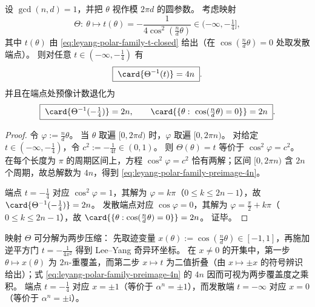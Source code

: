 \begin{proposition}[推前覆盖度与退化预像计数]\label{prop:leyang-polar-family-preimage-count}
设 \(\gcd(n,d)=1\)，并把 \(\theta\) 视作模 \(2\pi d\) 的圆参数。
考虑映射
\[
\Theta:\ \theta\longmapsto t(\theta)=-\frac{1}{4\cos^2(\frac{n}{d}\theta)}\in(-\infty,-\tfrac14],
\]
其中 \(t(\theta)\) 由 \eqref{eq:leyang-polar-family-t-closed} 给出（在 \(\cos(\frac{n}{d}\theta)=0\) 处取发散端点）。
则对任意 \(t\in(-\infty,-\tfrac14)\) 有
\begin{equation}\label{eq:leyang-polar-family-preimage-4n}
\boxed{\;\card{\Theta^{-1}(t)}=4n\; }.
\end{equation}
并且在端点处预像计数退化为
\begin{equation}\label{eq:leyang-polar-family-preimage-endpoints}
\boxed{\;
\card{\Theta^{-1}(-\tfrac14)}=2n,\qquad
\card{\{\theta:\ \cos(\tfrac{n}{d}\theta)=0\}}=2n\; }.
\end{equation}
\end{proposition}
\begin{proof}
令 \(\varphi:=\frac{n}{d}\theta\)。
当 \(\theta\) 取遍 \([0,2\pi d)\) 时，\(\varphi\) 取遍 \([0,2\pi n)\)。
对给定 \(t\in(-\infty,-\tfrac14)\)，令 \(c^2:=-\frac{1}{4t}\in(0,1)\)。
则 \(\Theta(\theta)=t\) 等价于 \(\cos^2\varphi=c^2\)。
在每个长度为 \(\pi\) 的周期区间上，方程 \(\cos^2\varphi=c^2\) 恰有两解；区间 \([0,2\pi n)\) 含 \(2n\) 个周期，故总解数为 \(4n\)，得到 \eqref{eq:leyang-polar-family-preimage-4n}。
\par
端点 \(t=-\tfrac14\) 对应 \(\cos^2\varphi=1\)，其解为 \(\varphi=k\pi\)（\(0\le k\le 2n-1\)），故 \(\card{\Theta^{-1}(-\tfrac14)}=2n\)。
发散端点对应 \(\cos\varphi=0\)，其解为 \(\varphi=\frac{\pi}{2}+k\pi\)（\(0\le k\le 2n-1\)），故 \(\card{\{\theta:\cos(\tfrac{n}{d}\theta)=0\}}=2n\)。
证毕。
\end{proof}

\begin{remark}[双层分解与覆盖度解释]\label{rem:leyang-polar-family-two-layer-factorization}
映射 \(\Theta\) 可分解为两步压缩：
先取迹变量
\(
x(\theta):=\cos(\tfrac{n}{d}\theta)\in[-1,1]
\)，再施加逆平方门
\(
t=-\frac{1}{4x^2}
\)
得到 Lee--Yang 奇异环坐标。
在 \(x\neq 0\) 的开集中，第一步 \(\theta\mapsto x(\theta)\) 为 \(2n\)-重覆盖，而第二步 \(x\mapsto t\) 为二值折叠（由 \(x\mapsto \pm x\) 的符号辨识给出）；式 \eqref{eq:leyang-polar-family-preimage-4n} 的 \(4n\) 因而可视为两步覆盖度之乘积。
端点 \(t=-\tfrac14\) 对应 \(x=\pm 1\)（等价于 \(\alpha^n=\pm 1\)），而发散端 \(t=-\infty\) 对应 \(x=0\)（等价于 \(\alpha^n=\pm\mathrm{i}\)）。
\end{remark}

